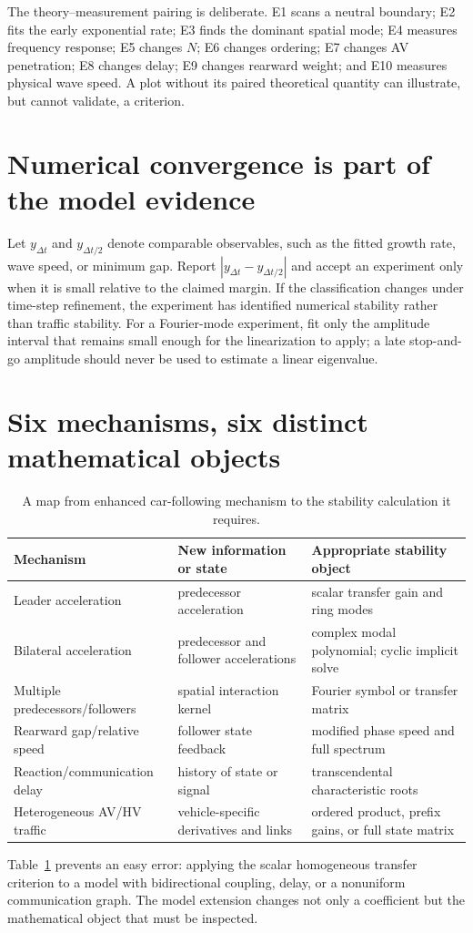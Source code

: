 \documentclass[11pt,a4paper,openany]{book}
\numberwithin{equation}{chapter}
\numberwithin{figure}{chapter}
\numberwithin{table}{chapter}
\begin{document}
The theory--measurement pairing is deliberate. E1 scans a neutral boundary; E2 fits the early exponential rate; E3 finds the dominant spatial mode; E4 measures frequency response; E5 changes $N$; E6 changes ordering; E7 changes AV penetration; E8 changes delay; E9 changes rearward weight; and E10 measures physical wave speed. A plot without its paired theoretical quantity can illustrate, but cannot validate, a criterion.

\section{Numerical convergence is part of the model evidence}
Let $y_{\Delta t}$ and $y_{\Delta t/2}$ denote comparable observables, such as the fitted growth rate, wave speed, or minimum gap. Report $|y_{\Delta t}-y_{\Delta t/2}|$ and accept an experiment only when it is small relative to the claimed margin. If the classification changes under time-step refinement, the experiment has identified numerical stability rather than traffic stability. For a Fourier-mode experiment, fit only the amplitude interval that remains small enough for the linearization to apply; a late stop-and-go amplitude should never be used to estimate a linear eigenvalue.

\section{Six mechanisms, six distinct mathematical objects}
\begin{table}[htbp]\centering\caption{A map from enhanced car-following mechanism to the stability calculation it requires.}\label{tab:factor-map}
\begin{tabular}{p{3.4cm}p{4.2cm}p{5.0cm}}\toprule
Mechanism & New information or state & Appropriate stability object\\\midrule
Leader acceleration & predecessor acceleration & scalar transfer gain and ring modes\\
Bilateral acceleration & predecessor and follower accelerations & complex modal polynomial; cyclic implicit solve\\
Multiple predecessors/followers & spatial interaction kernel & Fourier symbol or transfer matrix\\
Rearward gap/relative speed & follower state feedback & modified phase speed and full spectrum\\
Reaction/communication delay & history of state or signal & transcendental characteristic roots\\
Heterogeneous AV/HV traffic & vehicle-specific derivatives and links & ordered product, prefix gains, or full state matrix\\\bottomrule
\end{tabular}\end{table}
Table~\ref{tab:factor-map} prevents an easy error: applying the scalar homogeneous transfer criterion to a model with bidirectional coupling, delay, or a nonuniform communication graph. The model extension changes not only a coefficient but the mathematical object that must be inspected.
\end{document}
